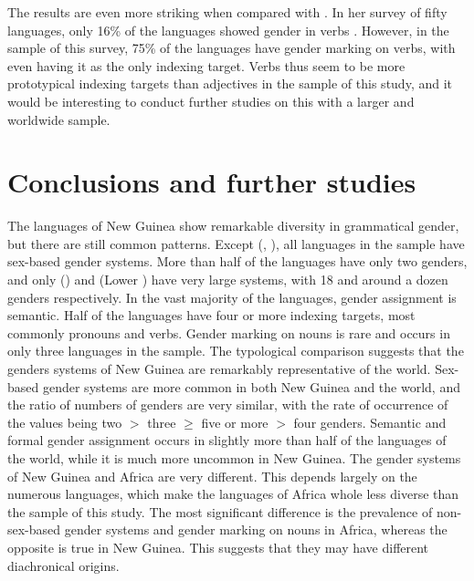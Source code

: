 \documentclass[output=collectionpaper]{langsci/langscibook}
\begin{document}
The results are even more striking when compared with \citet{Bybee1985}. In her survey of fifty languages, only 16\% of the languages showed gender in verbs \citep[18]{Bybee1985}. However, in the sample of this survey, 75\% of the languages have gender marking on verbs, with  even having it as the only indexing target. Verbs thus seem to be more prototypical indexing targets than adjectives in the sample of this study, and it would be interesting to conduct further studies on this with a larger and worldwide sample.


\section{Conclusions and further studies}

The languages of New Guinea show remarkable diversity in grammatical gender, but there are still common patterns. Except  (, ), all languages in the sample have sex-based gender systems. More than half of the languages have only two genders, and only  () and  (Lower ) have very large systems, with 18 and around a dozen genders respectively. In the vast majority of the languages, gender assignment is semantic. Half of the languages have four or more indexing targets, most commonly pronouns and verbs. Gender marking on nouns is rare and occurs in only three languages in the sample. The typological comparison suggests that the genders systems of New Guinea are remarkably representative of the world. Sex-based gender systems are more common in both New Guinea and the world, and the ratio of numbers of genders are very similar, with the rate of occurrence of the values being two $>$ three ${\geq}$ five or more $>$ four genders. Semantic and formal gender assignment occurs in slightly more than half of the languages of the world, while it is much more uncommon in New Guinea. The gender systems of New Guinea and Africa are very different. This depends largely on the numerous  languages, which make the languages of Africa whole less diverse than the sample of this study. The most significant difference is the prevalence of non-sex-based gender systems and gender marking on nouns in Africa, whereas the opposite is true in New Guinea. This suggests that they may have different diachronical origins.
\end{document}
